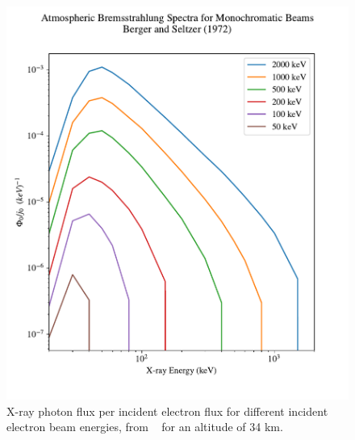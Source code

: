 \begin{figure}[p]
\label{berger_seltzer_curves_1}
\centering
\includegraphics[width=1.0\textwidth]{figures/chapter_3/berger-seltzer-curves/berger_seltzer_curves_1}
\caption{X-ray photon flux per incident electron flux for different incident electron beam energies, from ~\cite{Berger1972} for an altitude of 34 km. }
\end{figure}

